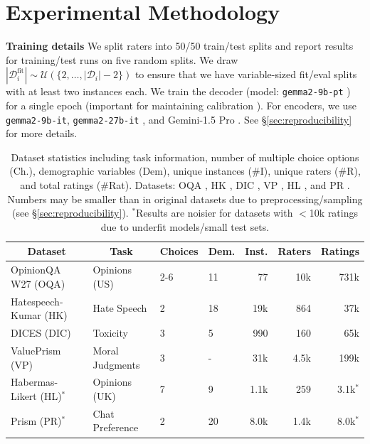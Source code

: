 \documentclass[11pt]{article}
\begin{document}
\section{Experimental Methodology}
\label{sec:experimental methodology}

\textbf{Training details }
We split raters into 50/50 train/test splits and report results for training/test runs on five random splits. We draw $|\mathcal{D}_i^{\text{fit}}| \sim \mathcal{U}(\{2,\ldots,|\mathcal{D}_i|-2\})$ to ensure that we have variable-sized fit/eval splits with at least two instances each. We train the decoder (model: \texttt{gemma2-9b-pt} \citep{gemmateam2024gemma2improvingopen}) for a single epoch (important for maintaining calibration \citep{ji2021earlystoppedneuralnetworksconsistent}).  For encoders, we use \texttt{gemma2-9b-it}, \texttt{gemma2-27b-it} \citep{gemmateam2024gemma2improvingopen}, and Gemini-1.5 Pro \citep{geminiteam2024gemini15unlockingmultimodal}. See \S \ref{sec:reproducibility} for more details.

\begin{table}[h]
\centering
\small
\begin{tabular}{llllrrr}
\toprule
\multicolumn{1}{c}{\bf Dataset}  &\multicolumn{1}{c}{\bf Task}  &\multicolumn{1}{c}{\bf Choices}   &\multicolumn{1}{c}{\bf Dem.}   &\multicolumn{1}{c}{\bf Inst.}   &\multicolumn{1}{c}{\bf Raters}   &\multicolumn{1}{c}{\bf Ratings} \\
\hline
OpinionQA W27 (OQA) & Opinions (US) & 2-6 & 11 & 77 & 10k & 731k \\
Hatespeech-Kumar (HK) & Hate Speech & 2 & 18 & 19k & 864 & 37k \\
DICES (DIC) & Toxicity & 3 & 5 & 990 & 160 & 65k \\
ValuePrism (VP) & Moral Judgments & 3 & - & 31k & 4.5k & 199k \\
Habermas-Likert (HL)$^*$ & Opinions (UK) & 7 & 9 & 1.1k & 259 & 3.1k$^*$ \\
Prism (PR)$^*$
& Chat Preference & 2 & 20 & 8.0k & 1.4k & 8.0k$^*$ \\
\hline
\end{tabular}
\small{
\caption{
Dataset statistics including task information, number of multiple choice options (Ch.), demographic variables (Dem), unique instances (\#I), unique raters (\#R), and total ratings (\#Rat). Datasets: OQA \citep{santurkar2023opinionslanguagemodelsreflect}, HK \citep{kumar2021designingtoxiccontentclassification}, DIC \citep{aroyo2023dicesdatasetdiversityconversational}, VP \citep{Sorensen_Jiang_Hwang_Levine_Pyatkin_West_Dziri_Lu_Rao_Bhagavatula_Sap_Tasioulas_Choi_2024}, HL \citep{habermas}, and PR \citep{kirk2024prismalignmentdatasetparticipatory}. Numbers may be smaller than in original datasets due to preprocessing/sampling (see \S\ref{sec:reproducibility}).
$^*$Results are noisier for datasets with $<$10k ratings due to underfit models/small test sets.
}
\label{tab:dataset_statistics}
}
\end{table}
\end{document}
